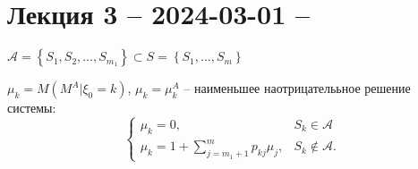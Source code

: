 \section{Лекция 3 -- 2024-03-01 -- }

\begin{theorem}
  $\mathcal{A} = \left\{ S_1, S_2, \dots, S_{m_1} \right\} \subset S = \left\{ S_1, \dots, S_m \right\} $
\end{theorem}




\begin{theorem}
  $\mu_k = M(M^A | \xi_0=k)$, $\mu_k = \mu_k^A$ -- наименьшее наотрицателььное решение системы:
  \[
    \begin{cases}
      \mu_k = 0, & S_k \in \mathcal{A} \\
      \mu_k = 1 + \sum_{j={m_1+1}}^m p_{kj} \mu_j, &S_k \notin \mathcal{A}.
    \end{cases}
  \]
\end{theorem}


